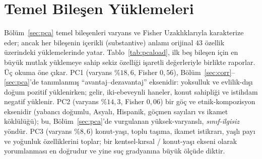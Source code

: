 \documentclass{ieeeaccess}
\begin{document}
\section{Temel Bileşen Yüklemeleri}
\label{app:pcaload}
Bölüm~\ref{sec:pca} temel bileşenleri varyans ve Fisher Uzaklıklarıyla karakterize eder; ancak her bileşenin içerikli (substantive) anlamı orijinal $43$ özellik üzerindeki yüklemelerinde yatar. Tablo~\ref{tab:pcaload}, ilk beş bileşen için en büyük mutlak yüklemeye sahip sekiz özelliği işaretli değerleriyle birlikte raporlar. Üç okuma öne çıkar. PC1 (varyans $\%18{,}6$, Fisher $0{,}56$), Bölüm~\ref{sec:corr}--\ref{sec:pca}'de tanımlanmış ``avantaj--dezavantaj'' eksenidir: yoksulluk ve evlilik-dışı doğum pozitif yüklenirken; gelir, iki-ebeveynli haneler, konut sahipliği ve istihdam negatif yüklenir. PC2 (varyans $\%14{,}3$, Fisher $0{,}06$) bir göç ve etnik-kompozisyon eksenidir (yabancı doğumlu, Asyalı, Hispanik, göçmen sayıları vs ikamet köklülüğü); bu, Bölüm~\ref{sec:pca}'de vurgulanan yüksek-varyanslı, \emph{sınıf-ilgisiz} yöndür. PC3 (varyans $\%8{,}6$) konut-yaşı, toplu taşıma, ikamet istikrarı, yaşlı payı ve yoğunluk özelliklerini toplar; bir kentsel-kırsal / konut-yaşı ekseni olarak yorumlanması en doğrudur ve yine suç gradyanına büyük ölçüde diktir.
\end{document}
